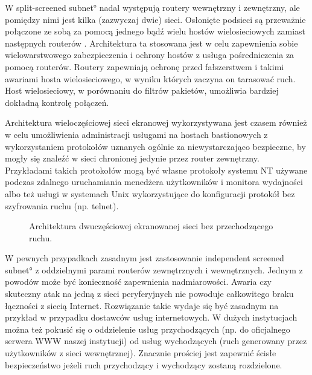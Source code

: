 W  \ang{split-screened subnet} nadal
występują routery wewnętrzny i zewnętrzny, ale pomiędzy nimi jest kilka
(zazwyczaj dwie) sieci. Osłonięte podsieci są przeważnie połączone ze sobą
za pomocą jednego bądź wielu hostów wielosieciowych zamiast następnych
routerów . Architektura ta stosowana jest w celu
zapewnienia sobie wielowarstwowego zabezpieczenia i ochrony hostów z usługa
pośredniczenia za pomocą routerów. Routery zapewniają ochronę przed
fałszerstwem i takimi awariami hosta wielosieciowego, w wyniku których
zaczyna on tarasować ruch.  Host wielosieciowy, w porównaniu do filtrów
pakietów, umożliwia bardziej dokładną kontrolę połączeń.

Architektura wieloczęściowej sieci ekranowej wykorzystywana jest czasem
również w celu umożliwienia administracji usługami na hostach bastionowych
z wykorzystaniem protokołów uznanych ogólnie za niewystarczająco bezpieczne,
by mogły się znaleźć w sieci chronionej jedynie przez router zewnętrzny.
Przykładami takich protokołów mogą być własne protokoły systemu NT używane
podczas zdalnego uruchamiania menedżera użytkowników i monitora wydajności
albo też usługi w systemach Unix wykorzystujące do konfiguracji protokół
bez szyfrowania ruchu (np. telnet).

\begin{figure*}
\begin{center}

\end{center}
\caption[Architektura dwuczęściowej ekranowanej sieci bez przechodzącego ruchu]
{\label{fig:screenedsubnet2} Architektura dwuczęściowej ekranowanej sieci
bez przechodzącego ruchu.}
\end{figure*}

W pewnych przypadkach zasadnym jest zastosowanie \ang{independent screened subnet} z oddzielnymi parami routerów
zewnętrznych i wewnętrznych. Jednym z powodów może być konieczność
zapewnienia nadmiarowości. Awaria czy skuteczny atak na jedną z sieci
peryferyjnych nie powoduje całkowitego braku łączności z siecią Internet.
Rozwiązanie takie wydaje się być zasadnym na przykład w przypadku dostawców
usług internetowych.  W dużych instytucjach można też pokusić się o
oddzielenie usług przychodzących (np. do oficjalnego serwera WWW naszej
instytucji) od usług wychodzących (ruch generowany przez użytkowników z
sieci wewnętrznej). Znacznie prościej jest zapewnić ścisłe bezpieczeństwo
jeżeli ruch przychodzący i wychodzący zostaną rozdzielone.

